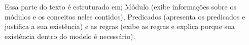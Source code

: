 Essa parte do texto é estruturado em; Módulo (exibe informações sobre os módulos e os conceitos neles contidos), Predicados (apresenta os predicados 
e justifica a sua existência) e as regras (exibe as regras e explica porque sua existência dentro do modelo é necessário). 